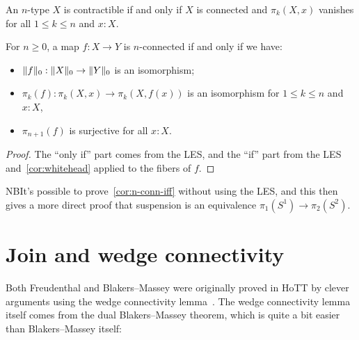 \documentclass[10pt,oneside,leqno,openright]{memoir}
\begin{document}
\begin{corollary}
  \label{cor:whitehead}
  An $n$-type $X$ is contractible if and only if $X$ is connected and
  $\pi_k(X,x)$ vanishes for all $1\le k\le n$ and $x:X$.
\end{corollary}
\begin{corollary}
  \label{cor:n-conn-iff}
  For $n\ge 0$, a map $f:X\to Y$ is $n$-connected if and only if we have:
  \begin{itemize}
  \item $\lVert f\rVert_0 : \lVert X\rVert_0 \to \lVert Y\rVert_0$ is an isomorphism;
  \item $\pi_k(f) : \pi_k(X,x) \to \pi_k(X,f(x))$ is an isomorphism for $1\le k\le n$ and $x:X$,
  \item $\pi_{n+1}(f)$ is surjective for all $x:X$.
  \end{itemize}
\end{corollary}
\begin{proof}
  The ``only if'' part comes from the LES, and the ``if'' part from the LES
  and~\cref{cor:whitehead} applied to the fibers of $f$.
\end{proof}

NB\enspace It's possible to prove~\cref{cor:n-conn-iff} without using the LES,
and this then gives a more direct proof that suspension is an equivalence $\pi_1(S^1) \to \pi_2(S^2)$.

\section*{Join and wedge connectivity}

Both Freudenthal and Blakers--Massey were originally proved in HoTT by clever
arguments using the wedge connectivity
lemma~\parencite{LumsdaineLicata,BlakersMasseyHoTT}.
The wedge connectivity lemma itself comes from the dual Blakers--Massey theorem, which is quite a bit easier than Blakers--Massey itself:
\end{document}
